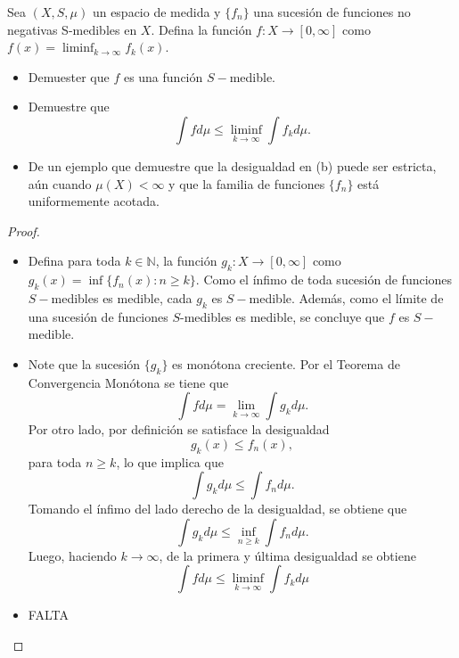 \documentclass[12pt]{article}
\newcommand{\N}{\mathbb{N}}
\newenvironment{problem}[2][Problema]{\begin{trivlist}
\item[\hskip \labelsep {\bfseries #1}\hskip \labelsep {\bfseries #2.}]}{\end{trivlist}}
\begin{document}
\begin{problem}{16} Sea $(X, S, \mu)$ un espacio de medida y $\{f_n\}$ una sucesión de funciones no negativas S-medibles en $X$. Defina la función $f: X \rightarrow [0, \infty]$ como $f(x) = \liminf_{k\to \infty} f_k(x)$.
\begin{itemize}
    \item[(a)] Demuester que $f$ es una función $S-$medible.
    \item[(b)] Demuestre que $$\int f d\mu \leq \liminf_{k \to \infty} \int f_k d\mu.$$
    \item[(c)] De un ejemplo que demuestre que la desigualdad en (b) puede ser estricta, aún cuando $\mu(X) < \infty$ y que la familia de funciones $\{f_n\}$ está uniformemente acotada.
\end{itemize}
\end{problem}
\begin{proof}
    \begin{itemize}
        \item[(a)] Defina para toda $k\in \N$, la función $g_k: X \rightarrow [0, \infty]$ como $ g_k(x)= \inf \{f_n(x): n \geq k\}.$ Como el ínfimo de toda sucesión de funciones $S-$medibles es medible, cada $g_k$ es $S-$medible. Además, como el límite de una sucesión de funciones $S$-medibles es medible, se concluye que $f$ es $S-$medible.
        
        
        \item[(b)] Note que la sucesión $\{g_k\}$ es monótona creciente. Por el Teorema de Convergencia Monótona se tiene que 
        $$\int f d \mu = \lim_{k \to \infty} \int g_k d \mu.$$
        Por otro lado, por definición se satisface la desigualdad
        $$g_k(x) \leq f_n(x),$$
        para toda $n \geq k$, lo que implica que
        $$\int g_k d \mu \leq \int f_n d\mu.$$
        Tomando el ínfimo del lado derecho de la desigualdad, se obtiene que
        $$\int g_k d \mu \leq \inf_{n \geq k} \int f_n d\mu.$$
        Luego, haciendo $k \to \infty$, de la primera y última desigualdad se obtiene
        $$\int f d \mu \leq \liminf_{k \to \infty} \int f_k d \mu$$

        \item[(c)] FALTA
    \end{itemize}
\end{proof}
\end{document}
